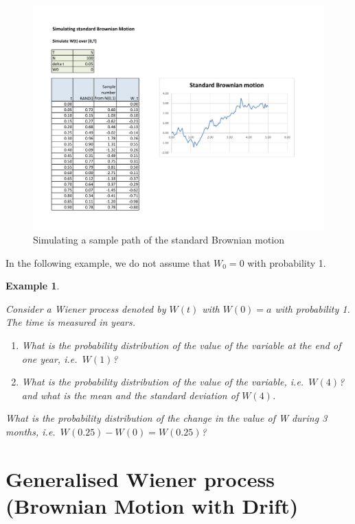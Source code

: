 \documentclass[landscape, 20pt]{extreport}
\theoremstyle{definition}
\theoremstyle{definition}
\newtheorem{example}{Example}[chapter]
\theoremstyle{definition}
\theoremstyle{definition}
\theoremstyle{remark}
\begin{document}
\begin{figure}
\hypertarget{fig:BM}{%
\centering
\includegraphics[width=8in,height=\textheight]{BM.pdf}
\caption{Simulating a sample path of the standard Brownian
motion}\label{fig:BM}
}
\end{figure}

In the following example, we do not assume that \(W_0 = 0\) with
probability 1.

\newpage \begin{example}
\protect\hypertarget{exm:unlabeled-div-68}{}\label{exm:unlabeled-div-68}

\emph{Consider a Wiener process denoted by \(W(t)\) with
\(W(0) = a\) with probability 1. The time is measured in years.}

\begin{enumerate}
\def\labelenumi{\arabic{enumi}.}
\item
  \emph{What is the probability distribution of the value of the variable
  at the end of one year, i.e.~\(W(1)\)?}
\item
  \emph{What is the probability distribution of the value of the variable,
  i.e.~\(W(4)\)? and what is the mean and the standard deviation of
  \(W(4)\).}
\end{enumerate}

\emph{What is the probability distribution of the change in the value of W
during 3 months, i.e.~\(W(0.25) - W(0) = W(0.25)\)?}

\end{example}

\hypertarget{generalised-wiener-process-brownian-motion-with-drift}{%
\section{Generalised Wiener process (Brownian Motion with Drift)}\label{generalised-wiener-process-brownian-motion-with-drift}}
\end{document}
